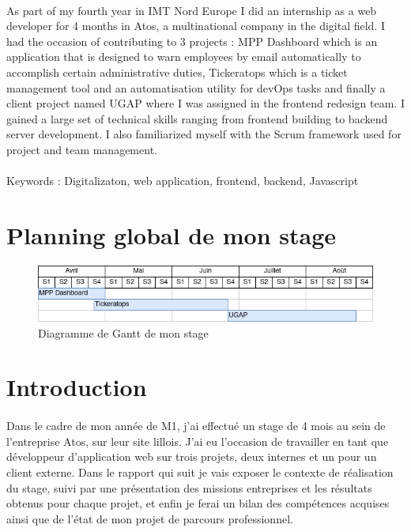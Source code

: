 \documentclass[12pt]{article}
\begin{document}
\begin {sloppypar}
\paragraph{}
As part of my fourth year in IMT Nord Europe I did an internship as a web developer for 4 months 
in Atos, a multinational company in the digital field. I had the occasion of contributing to 3 projects : 
MPP Dashboard which is an application that is designed to warn employees by email automatically to accomplish certain 
administrative duties, Tickeratops which is a ticket management tool and an automatisation utility for devOps tasks and 
finally a client project named UGAP where I was assigned in the frontend redesign team. I gained a large set of technical 
skills ranging from frontend building to backend server development. I also familiarized myself 
with the Scrum framework used for project and team management.
\paragraph{}
Keywords : Digitalizaton, web application, frontend, backend, Javascript
\newpage

\section*{Planning global de mon stage}
\begin{figure}[h]
  \includegraphics[width=\textwidth] {gantt.png}
  \caption {Diagramme de Gantt de mon stage}
\end{figure}
\newpage

\section{Introduction}
\paragraph{}
Dans le cadre de mon année de M1, j'ai effectué un stage de 4 mois au sein de l'entreprise 
Atos, sur leur site lillois. J'ai eu l'occasion de travailler en tant que développeur d'application 
web sur trois projets, deux internes et un pour un client externe. Dans le rapport qui suit je vais exposer le contexte 
de réalisation du stage, suivi par une présentation des missions entreprises et les résultats obtenus pour chaque projet,
et enfin je ferai un bilan des compétences acquises ainsi que de l'état de mon projet de parcours professionnel. 


\end{sloppypar}
\end{document}
